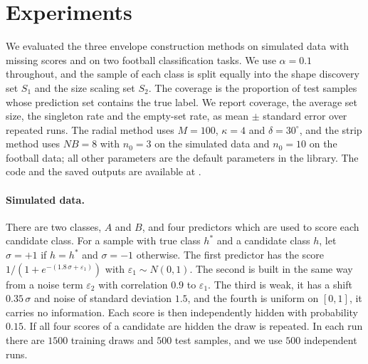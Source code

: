 \section{Experiments}\label{sec:experiments}

We evaluated the three envelope construction methods on simulated data with missing scores and on two football 
classification tasks. We use $\alpha=0.1$ throughout, and the sample of each class is split equally into the shape discovery 
set $S_1$ and the size scaling set $S_2$. The coverage is the proportion of test samples whose prediction set contains 
the true label. We report coverage, the average set size, the singleton rate and the empty-set rate, as mean $\pm$ 
standard error over repeated runs. The radial method uses $M=100$, $\kappa=4$ and $\delta=30^\circ$, and the strip 
method uses $NB=8$ with $n_0=3$ on the simulated data and $n_0=10$ on the football data; all other parameters are the 
default parameters in the library. The code and the saved outputs are available at \citep{conformalenvelopes}.

\paragraph{Simulated data.} There are two classes, $A$ and $B$, and four predictors which are used to score each candidate 
class. For a sample with true class $h^\ast$ and a candidate class $h$, let $\sigma=+1$ if $h=h^\ast$ and $\sigma=-1$ 
otherwise. The first predictor has the score $1/(1+e^{-(1.8\,\sigma+\varepsilon_1)})$ with $\varepsilon_1\sim N(0,1)$. 
The second is built in the same way from a noise term $\varepsilon_2$ with correlation $0.9$ to $\varepsilon_1$. The 
third is weak, it has a shift $0.35\,\sigma$ and noise of standard deviation $1.5$, and the fourth is uniform on $[0,1]$, 
it carries no information. Each score is then independently hidden with probability $0.15$. If all four scores of a 
candidate are hidden the draw is repeated. In each run there are $1500$ training draws and $500$ test samples, and we use 
$500$ independent runs.

